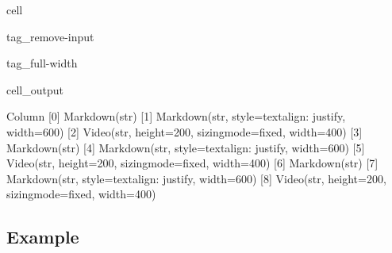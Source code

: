 \documentclass[letterpaper,10pt,english]{jupyterBook}
\begin{document}
\begin{sphinxuseclass}{cell}
\begin{sphinxuseclass}{tag_remove-input}
\begin{sphinxuseclass}{tag_full-width}\begin{sphinxVerbatimOutput}

\begin{sphinxuseclass}{cell_output}
\begin{sphinxVerbatim}[commandchars=\\\{\}]
Column
    [0] Markdown(str)
    [1] Markdown(str, style=\PYGZob{}\PYGZsq{}text\PYGZhy{}align\PYGZsq{}: \PYGZsq{}justify\PYGZsq{}\PYGZcb{}, width=600)
    [2] Video(str, height=200, sizing\PYGZus{}mode=\PYGZsq{}fixed\PYGZsq{}, width=400)
    [3] Markdown(str)
    [4] Markdown(str, style=\PYGZob{}\PYGZsq{}text\PYGZhy{}align\PYGZsq{}: \PYGZsq{}justify\PYGZsq{}\PYGZcb{}, width=600)
    [5] Video(str, height=200, sizing\PYGZus{}mode=\PYGZsq{}fixed\PYGZsq{}, width=400)
    [6] Markdown(str)
    [7] Markdown(str, style=\PYGZob{}\PYGZsq{}text\PYGZhy{}align\PYGZsq{}: \PYGZsq{}justify\PYGZsq{}\PYGZcb{}, width=600)
    [8] Video(str, height=200, sizing\PYGZus{}mode=\PYGZsq{}fixed\PYGZsq{}, width=400)
\end{sphinxVerbatim}

\end{sphinxuseclass}\end{sphinxVerbatimOutput}

\end{sphinxuseclass}
\end{sphinxuseclass}
\end{sphinxuseclass}

\subsection{Example}
\label{\detokenize{content/flow/L3/13_gw_storage:example}}
\end{document}
